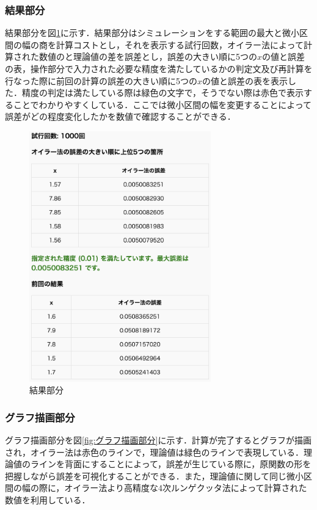 \documentclass[a4paper, 12pt]{ltjsarticle}
\begin{document}
\subsubsection{結果部分}
結果部分を図\ref{fig:結果部分}に示す．結果部分はシミュレーションをする範囲の最大と微小区間の幅の商を計算コストとし，それを表示する試行回数，オイラー法によって計算された数値のと理論値の差を誤差とし，誤差の大きい順に5つの$x$の値と誤差の表，操作部分で入力された必要な精度を満たしているかの判定文及び再計算を行なった際に前回の計算の誤差の大きい順に5つの$x$の値と誤差の表を表示した．精度の判定は満たしている際は緑色の文字で，そうでない際は赤色で表示することでわかりやすくしている．ここでは微小区間の幅を変更することによって誤差がどの程度変化したかを数値で確認することができる．

\begin{figure}[h]
\begin{center}
\includegraphics[clip,width=0.7\textwidth,keepaspectratio]{sim-kekka.png}
\end{center}
\caption{結果部分}
\label{fig:結果部分}
\end{figure}

\clearpage

\subsubsection{グラフ描画部分}
グラフ描画部分を図\ref{fig:グラフ描画部分}に示す．計算が完了するとグラフが描画され，オイラー法は赤色のラインで，理論値は緑色のラインで表現している．理論値のラインを背面にすることによって，誤差が生じている際に，原関数の形を把握しながら誤差を可視化することができる．また，理論値に関して同じ微小区間の幅の際に，オイラー法より高精度な4次ルンゲクッタ法によって計算された数値を利用している．
\end{document}
